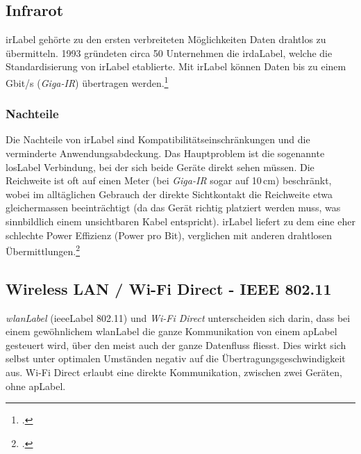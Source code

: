 


\subsection{Infrarot}
\gls{irLabel} gehörte zu den ersten verbreiteten Möglichkeiten Daten drahtlos zu übermitteln.
1993 gründeten circa 50 Unternehmen die \gls{irdaLabel}, welche die Standardisierung von \gls{irLabel} etablierte.
Mit \gls{irLabel} können Daten bis zu einem Gbit/s (\textit{Giga-IR}) übertragen werden.\footcite{Infrared_Data_Association_Wikipedia_2015-05-22}

\subsubsection{Nachteile}
Die Nachteile von \gls{irLabel} sind Kompatibilitätseinschränkungen und die verminderte Anwendungsabdeckung.
Das Hauptproblem ist die sogenannte \gls{losLabel} Verbindung, bei der sich beide Geräte direkt sehen müssen.
Die Reichweite ist oft auf einen Meter (bei \textit{Giga-IR} sogar auf 10\,cm) beschränkt, wobei im alltäglichen Gebrauch der direkte Sichtkontakt die Reichweite etwa gleichermassen beeinträchtigt (da das Gerät richtig platziert werden muss, was sinnbildlich einem unsichtbaren Kabel entspricht).
\gls{irLabel} liefert zu dem eine eher schlechte Power Effizienz (Power pro Bit), verglichen mit anderen drahtlosen Übermittlungen.\footcite{Comparing_Low_Power_Wireless_Technologies_DigiKey_2015-05-22}


\subsection{Wireless LAN / Wi-Fi Direct - IEEE 802.11}
\textit{\gls{wlanLabel}} (\gls{ieeeLabel} 802.11) und \textit{Wi-Fi Direct} unterscheiden sich darin, dass bei einem gewöhnlichem \gls{wlanLabel} die ganze Kommunikation von einem \gls{apLabel} gesteuert wird, über den meist auch der ganze Datenfluss fliesst. Dies wirkt sich selbst unter optimalen Umständen negativ auf die Übertragungsgeschwindigkeit aus.
Wi-Fi Direct erlaubt eine direkte Kommunikation, zwischen zwei Geräten, ohne \gls{apLabel}.

